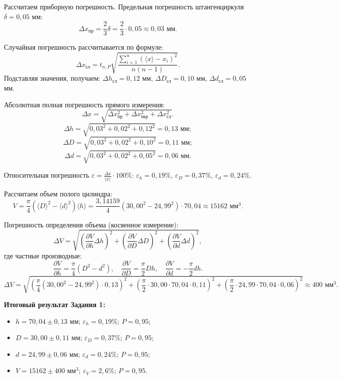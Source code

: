 Рассчитаем приборную погрешность. Предельная погрешность штангенциркуля $\delta = 0,05$ мм:
$$ \Delta x_{пр} = \frac{2}{3} \delta = \frac{2}{3} \cdot 0,05 \approx 0,03 \text{ мм}. $$

Случайная погрешность рассчитывается по формуле:
$$ \Delta x_{сл} = t_{n,P} \sqrt{\frac{\sum_{i=1}^{n}(\langle x \rangle - x_i)^2}{n(n-1)}}. $$
Подставляя значения, получаем: $\Delta h_{сл} = 0,12$ мм, $\Delta D_{сл} = 0,10$ мм, $\Delta d_{сл} = 0,05$ мм.

Абсолютная полная погрешность прямого измерения:
$$ \Delta x = \sqrt{\Delta x_{пр}^2 + \Delta x_{окр}^2 + \Delta x_{сл}^2}. $$
$$ \Delta h = \sqrt{0,03^2 + 0,02^2 + 0,12^2} = 0,13 \text{ мм}; $$
$$ \Delta D = \sqrt{0,03^2 + 0,02^2 + 0,10^2} = 0,11 \text{ мм}; $$
$$ \Delta d = \sqrt{0,03^2 + 0,02^2 + 0,05^2} = 0,06 \text{ мм}. $$

Относительная погрешность $\varepsilon = \frac{\Delta x}{\langle x \rangle} \cdot 100\%$:
$\varepsilon_h = 0,19\%$, $\varepsilon_D = 0,37\%$, $\varepsilon_d = 0,24\%$.

Рассчитаем объем полого цилиндра:
$$ V = \frac{\pi}{4}(\langle D \rangle^2 - \langle d \rangle^2)\langle h \rangle = \frac{3,14159}{4}(30,00^2 - 24,99^2) \cdot 70,04 \approx 15162 \text{ мм}^3. $$

Погрешность определения объема (косвенное измерение):
$$ \Delta V = \sqrt{\left(\frac{\partial V}{\partial h}\Delta h\right)^2 + \left(\frac{\partial V}{\partial D}\Delta D\right)^2 + \left(\frac{\partial V}{\partial d}\Delta d\right)^2}, $$
где частные производные:
$$ \frac{\partial V}{\partial h} = \frac{\pi}{4}(D^2 - d^2), \quad \frac{\partial V}{\partial D} = \frac{\pi}{2}Dh, \quad \frac{\partial V}{\partial d} = -\frac{\pi}{2}dh. $$
$$ \Delta V = \sqrt{\left(\frac{\pi}{4}(30,00^2 - 24,99^2) \cdot 0,13\right)^2 + \left(\frac{\pi}{2} \cdot 30,00 \cdot 70,04 \cdot 0,11\right)^2 + \left(\frac{\pi}{2} \cdot 24,99 \cdot 70,04 \cdot 0,06\right)^2} \approx 400 \text{ мм}^3. $$

\textbf{Итоговый результат Задания 1:}
\begin{itemize}
	\item $h = 70,04 \pm 0,13$ мм; $\varepsilon_h = 0,19\%$; $P = 0,95$;
	\item $D = 30,00 \pm 0,11$ мм; $\varepsilon_D = 0,37\%$; $P = 0,95$;
	\item $d = 24,99 \pm 0,06$ мм; $\varepsilon_d = 0,24\%$; $P = 0,95$;
	\item $V = 15162 \pm 400$ мм$^3$; $\varepsilon_V = 2,6\%$; $P = 0,95$.
\end{itemize}

